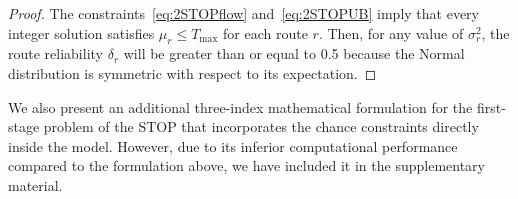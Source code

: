 \documentclass[11pt]{article}
\theoremstyle{definition}
\begin{document}
\begin{proof}
The constraints~\eqref{eq:2STOPflow} and~\eqref{eq:2STOPUB} imply that every integer solution satisfies $\mu_r \leq T_{\max}$ for each route $r$. Then, for any value of $\sigma^2_r$, the route reliability $\delta_r$ will be greater than or equal to 0.5 because the Normal distribution is symmetric with respect to its expectation.
\end{proof}

We also present an additional three-index mathematical formulation for the first-stage problem of the STOP that incorporates the chance constraints directly inside the model. However, due to its inferior computational performance compared to the formulation above, we have included it in the supplementary material.




\end{document}
